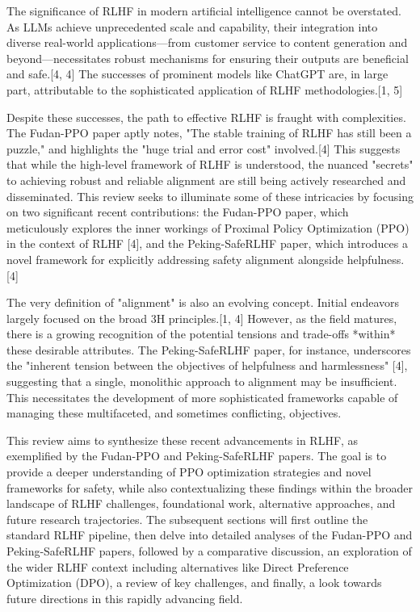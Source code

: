\documentclass[10pt,journal,compsoc]{IEEEtran} %
\begin{document}
The significance of RLHF in modern artificial intelligence cannot be overstated. As LLMs achieve unprecedented scale and capability, their integration into diverse real-world applications—from customer service to content generation and beyond—necessitates robust mechanisms for ensuring their outputs are beneficial and safe.[4, 4] The successes of prominent models like ChatGPT are, in large part, attributable to the sophisticated application of RLHF methodologies.[1, 5]

Despite these successes, the path to effective RLHF is fraught with complexities. The Fudan-PPO paper aptly notes, "The stable training of RLHF has still been a puzzle," and highlights the "huge trial and error cost" involved.[4] This suggests that while the high-level framework of RLHF is understood, the nuanced "secrets" to achieving robust and reliable alignment are still being actively researched and disseminated. This review seeks to illuminate some of these intricacies by focusing on two significant recent contributions: the Fudan-PPO paper, which meticulously explores the inner workings of Proximal Policy Optimization (PPO) in the context of RLHF [4], and the Peking-SafeRLHF paper, which introduces a novel framework for explicitly addressing safety alignment alongside helpfulness.[4]

The very definition of "alignment" is also an evolving concept. Initial endeavors largely focused on the broad 3H principles.[1, 4] However, as the field matures, there is a growing recognition of the potential tensions and trade-offs *within* these desirable attributes. The Peking-SafeRLHF paper, for instance, underscores the "inherent tension between the objectives of helpfulness and harmlessness" [4], suggesting that a single, monolithic approach to alignment may be insufficient. This necessitates the development of more sophisticated frameworks capable of managing these multifaceted, and sometimes conflicting, objectives.

This review aims to synthesize these recent advancements in RLHF, as exemplified by the Fudan-PPO and Peking-SafeRLHF papers. The goal is to provide a deeper understanding of PPO optimization strategies and novel frameworks for safety, while also contextualizing these findings within the broader landscape of RLHF challenges, foundational work, alternative approaches, and future research trajectories. The subsequent sections will first outline the standard RLHF pipeline, then delve into detailed analyses of the Fudan-PPO and Peking-SafeRLHF papers, followed by a comparative discussion, an exploration of the wider RLHF context including alternatives like Direct Preference Optimization (DPO), a review of key challenges, and finally, a look towards future directions in this rapidly advancing field.
\end{document}
